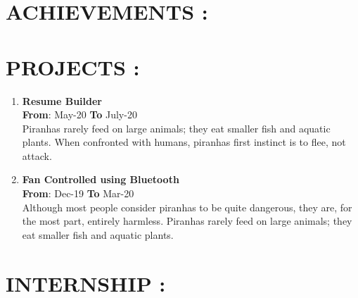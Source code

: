 \documentclass{article}
\begin{document}
{\begin{minipage}[t]{0.5\textwidth}
\section*{\large{\uppercase{achievements :}}}

\vspace{0pt}
\vspace{5pt}


\section*{\large{\uppercase{projects :}}}


\begin{enumerate}
	\item {\textbf{Resume Builder}}\\
	\hfill {\textbf{From}}: May-20 {\textbf{To}} July-20\\
	Piranhas rarely feed on large animals; they eat smaller fish and aquatic plants. When confronted with humans, piranhas first instinct is to flee, not attack. 
	\item {\textbf{Fan Controlled using Bluetooth}}\\
	\hfill {\textbf{From}}: Dec-19 {\textbf{To}} Mar-20\\
	Although most people consider piranhas to be quite dangerous, they are, for the most part, entirely harmless. Piranhas rarely feed on large animals; they eat smaller fish and aquatic plants.
\end{enumerate}

\vspace{5pt}

\section*{\large{\uppercase{Internship :}}}



\end{minipage}}
\end{document}
